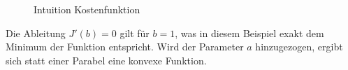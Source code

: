 \begin{enumerate}
\begin{figure}[htbp]
\centering
{}
\label{Abb:Lösungen}
\caption{Intuition Kostenfunktion}
\end{figure}
Die Ableitung $J'(b)=0$ gilt für $b=1$, was in diesem Beispiel exakt dem Minimum der Funktion entspricht. Wird der Parameter $a$ hinzugezogen, ergibt sich statt einer Parabel eine konvexe Funktion.


\end{enumerate}
